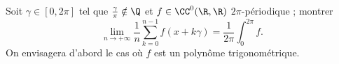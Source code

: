 \begin{enonce}
\begin{exercise}[ID={Cahier RMS 5 E149 X},subtitle={},tags={}]
  Soit $\gamma\in[0,2\pi]$ tel que $\frac\gamma\pi\notin\Q$ et $f\in\CC^0(\R,\R)$ $2\pi$-périodique ; montrer
  \begin{equation*}
    \lim_{n\to+\infty} \frac1n\sum_{k=0}^{n-1} f(x+k\gamma)=\frac1{2\pi}\int_0^{2\pi} f.
  \end{equation*}
  On envisagera d'abord le cas où $f$ est un polynôme trigonométrique.
\end{exercise}
\begin{solution}
\end{solution}
\end{enonce}
